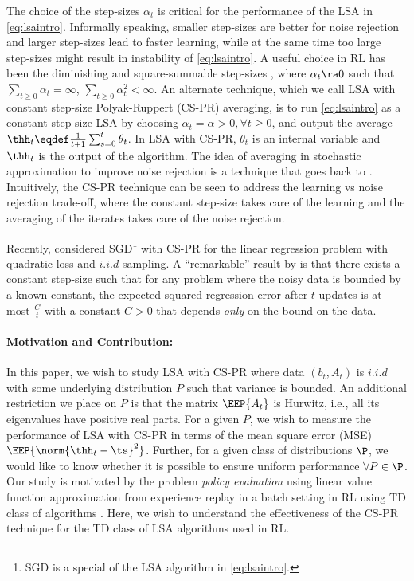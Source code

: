 The choice of the step-sizes $\alpha_t$ is critical for the performance of the LSA in \eqref{eq:lsaintro}.
Informally speaking, smaller step-sizes are better for noise rejection and larger step-sizes lead to faster learning, while at the same time too large step-sizes might result in instability of \eqref{eq:lsaintro}. A useful choice in RL has been the diminishing and square-summable step-sizes \cite{gtd2,borkarbook,konda-tsitsiklis}, where $\alpha_t\ra 0$ such that $\sum_{t\geq 0} \alpha_t=\infty$, $\sum_{t\geq 0}\alpha^2_t<\infty$. An alternate technique, which we call LSA with constant step-size Polyak-Ruppert (CS-PR) averaging, is to run \eqref{eq:lsaintro} as a constant step-size LSA by choosing $\alpha_t=\alpha>0,\forall t\geq 0$, and output the average $\thh_t\eqdef\frac{1}{t+1}\sum_{s=0}^t \theta_t$. In LSA with CS-PR, $\theta_t$ is an internal variable and $\thh_t$ is the output of the algorithm. The idea of averaging in stochastic approximation to improve noise rejection is a technique that goes back to  \citet{ruppert,polyak-judisky}. Intuitively, the CS-PR technique can be seen to address the learning vs noise rejection trade-off, where the constant step-size takes care of the learning  and the averaging of the iterates takes care of the noise rejection.
\par
Recently, \citet{bach} considered SGD\footnote{SGD is a special of the LSA algorithm in \eqref{eq:lsaintro}.} with CS-PR for the linear regression problem with quadratic loss and $i.i.d$ sampling. A ``remarkable'' result by \citet{bach} is that there exists a constant step-size such that for any problem where the noisy data is bounded by a known constant, the expected squared regression error after $t$ updates is at most $\frac{C}{t}$ with a constant $C>0$ that depends \emph{only} on the bound on the data.\par{}

\paragraph{Motivation and Contribution:} In this paper, we wish to study LSA with CS-PR where data $(b_t,A_t)$ is $i.i.d$ with some underlying distribution $P$ such that variance is bounded. An additional restriction we place on $P$ is that the matrix $\EEP{A_t}$ is Hurwitz, i.e., all its eigenvalues have positive real parts. For a given $P$, we wish to measure the performance of LSA with CS-PR in terms of the mean square error (MSE) $\EEP{\norm{\thh_t-\ts}^2}$. Further, for a given class of distributions $\P$, we would like to know whether it is possible to ensure uniform performance $\forall P\in \P$.
Our study is motivated by the problem \emph{policy evaluation} \cite{dann} using linear value function approximation from experience replay \cite{lin} in a batch setting \cite{lange} in RL using TD class  of algorithms \cite{sutton,konda-tsitsiklis,gtd,gtd2,gtdmp}. Here, we wish to understand the effectiveness of the CS-PR technique for the TD class of LSA algorithms used in RL.

